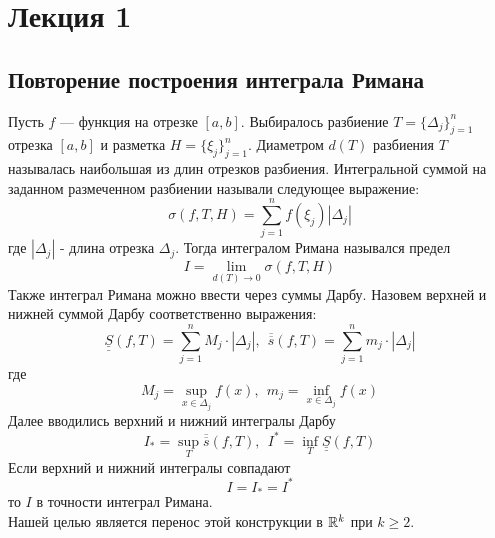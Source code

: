 \section{Лекция 1}
\subsection{Повторение построения интеграла Римана}
Пусть $f$ --- функция на отрезке $[a,b]$. Выбиралось разбиение $T=\{\Delta_j\}_{j=1}^n$ отрезка $[a,b]$ и разметка $H=\{\xi_j\}_{j=1}^n$. Диаметром $d(T)$ разбиения $T$ называлась наибольшая из длин отрезков разбиения. Интегральной суммой на заданном размеченном разбиении называли следующее выражение:
\[\sigma(f,T,H)=\sum\limits_{j=1}^{n}f(\xi_j)|\Delta_j|\]
где $|\Delta_j|$ - длина отрезка $\Delta_j$. Тогда интегралом Римана назывался предел
\[I=\lim\limits_{d(T)\to 0}\sigma(f,T,H)\]
Также интеграл Римана можно ввести через суммы Дарбу.
Назовем верхней и нижней суммой Дарбу соответственно выражения:
\[\underline{\underline{S}}(f,T)=\sum\limits_{j=1}^{n}M_j\cdot |\Delta_j|,\ \ \overline{\overline{s}}(f,T)=\sum\limits_{j=1}^n m_j\cdot |\Delta_j|\]
где
\[M_j=\sup\limits_{x\in \Delta_j}f(x),\ \ m_j=\inf\limits_{x\in \Delta_j}f(x)\]
Далее вводились верхний и нижний интегралы Дарбу
\[I_*=\sup\limits_{T} \overline{\overline{s}}(f,T),\ \ I^* = \inf\limits_{T} \underline{\underline{S}}(f,T)\]
Если верхний и нижний интегралы совпадают
\[I=I_*=I^*\]
то $I$ в точности интеграл Римана.\\
Нашей целью является перенос этой конструкции в $\mathbb{R}^k$ при $k\geq 2$.
